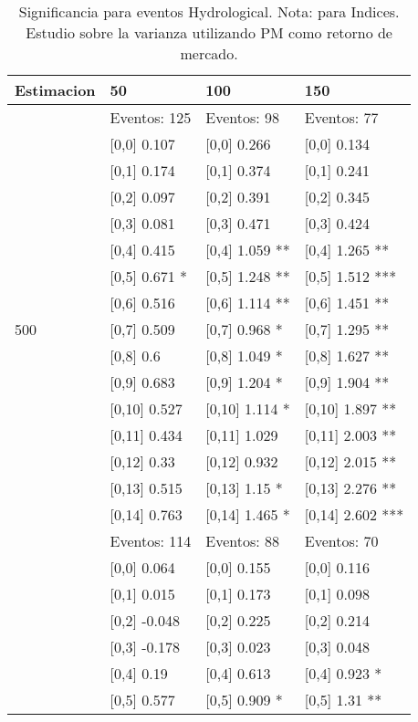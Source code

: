 \begin{table}

\caption{Significancia para eventos Hydrological. Nota: para Indices. Estudio sobre la varianza utilizando PM como retorno de mercado.}
\centering
\begin{tabular}[t]{llll}
\toprule
Estimacion & 50 & 100 & 150\\
\midrule
 & Eventos:  125 & Eventos:  98 & Eventos:  77\\
 & {}[0,0] 0.107 & {}[0,0] 0.266 & {}[0,0] 0.134\\
 & {}[0,1] 0.174 & {}[0,1] 0.374 & {}[0,1] 0.241\\
 & {}[0,2] 0.097 & {}[0,2] 0.391 & {}[0,2] 0.345\\
 & {}[0,3] 0.081 & {}[0,3] 0.471 & {}[0,3] 0.424\\
\addlinespace
 & {}[0,4] 0.415 & {}[0,4] 1.059 ** & {}[0,4] 1.265 **\\
 & {}[0,5] 0.671 * & {}[0,5] 1.248 ** & {}[0,5] 1.512 ***\\
 & {}[0,6] 0.516 & {}[0,6] 1.114 ** & {}[0,6] 1.451 **\\
500 & {}[0,7] 0.509 & {}[0,7] 0.968 * & {}[0,7] 1.295 **\\
 & {}[0,8] 0.6 & {}[0,8] 1.049 * & {}[0,8] 1.627 **\\
\addlinespace
 & {}[0,9] 0.683 & {}[0,9] 1.204 * & {}[0,9] 1.904 **\\
 & {}[0,10] 0.527 & {}[0,10] 1.114 * & {}[0,10] 1.897 **\\
 & {}[0,11] 0.434 & {}[0,11] 1.029 & {}[0,11] 2.003 **\\
 & {}[0,12] 0.33 & {}[0,12] 0.932 & {}[0,12] 2.015 **\\
 & {}[0,13] 0.515 & {}[0,13] 1.15 * & {}[0,13] 2.276 **\\
\addlinespace
 & {}[0,14] 0.763 & {}[0,14] 1.465 * & {}[0,14] 2.602 ***\\
 & Eventos:  114 & Eventos:  88 & Eventos:  70\\
 & {}[0,0] 0.064 & {}[0,0] 0.155 & {}[0,0] 0.116\\
 & {}[0,1] 0.015 & {}[0,1] 0.173 & {}[0,1] 0.098\\
 & {}[0,2] -0.048 & {}[0,2] 0.225 & {}[0,2] 0.214\\
\addlinespace
 & {}[0,3] -0.178 & {}[0,3] 0.023 & {}[0,3] 0.048\\
 & {}[0,4] 0.19 & {}[0,4] 0.613 & {}[0,4] 0.923 *\\
 & {}[0,5] 0.577 & {}[0,5] 0.909 * & {}[0,5] 1.31 **\\

\end{tabular}
\end{table}
